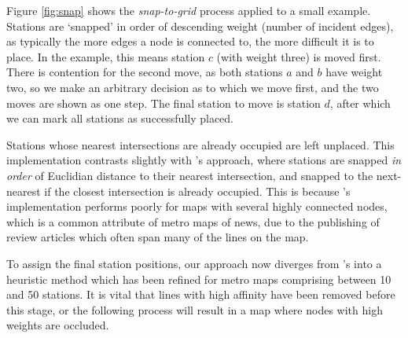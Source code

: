 Figure \ref{fig:snap} shows the \textit{snap-to-grid} process applied to a small example. Stations are `snapped' in order of descending weight (number of incident edges), as typically the more edges a node is connected to, the more difficult it is to place. In the example, this means station $c$ (with weight three) is moved first. There is contention for the second move, as both stations $a$ and $b$ have weight two, so we make an arbitrary decision as to which we move first, and the two moves are shown as one step. The final station to move is station $d$, after which we can mark all stations as successfully placed.

Stations whose nearest intersections are already occupied are left unplaced. This implementation contrasts slightly with \citeauthor{AutomaticMetroMapLayoutThesis}'s approach, where stations are snapped \textit{in order} of Euclidian distance to their nearest intersection, and snapped to the next-nearest if the closest intersection is already occupied. This is because \citeauthor{AutomaticMetroMapLayoutThesis}'s implementation performs poorly for maps with several highly connected nodes, which is a common attribute of metro maps of news, due to the publishing of review articles which often span many of the lines on the map.

To assign the final station positions, our approach now diverges from \citeauthor{AutomaticMetroMapLayoutThesis}'s into a heuristic method which has been refined for metro maps comprising between 10 and 50 stations. It is vital that lines with high affinity have been removed before this stage, or the following process will result in a map where nodes with high weights are occluded.

